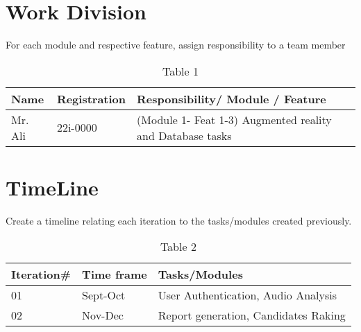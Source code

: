 \section{Work Division}
For each module and respective feature,  assign responsibility to a team member
\begin{table}[!h]
\caption{Table 1}
\begin{tabular}{|lll|}
\hline
Name   & Registration   & Responsibility/ Module / Feature   \\ \hline
Mr. Ali & 22i-0000 & (Module 1- Feat 1-3) Augmented reality and Database tasks    \\ \hline  
\end{tabular}
\end{table}

\section{TimeLine}
Create a timeline relating each iteration to the tasks/modules created previously.

\begin{table}[!h]
\caption{Table 2}
\begin{tabular}{|lll|} \hline
Iteration\# & Time frame & Tasks/Modules                        \\ \hline
01          & Sept-Oct   & User Authentication, Audio Analysis  \\ \hline
02          & Nov-Dec    & Report generation, Candidates Raking \\ \hline
\end{tabular}
\end{table}